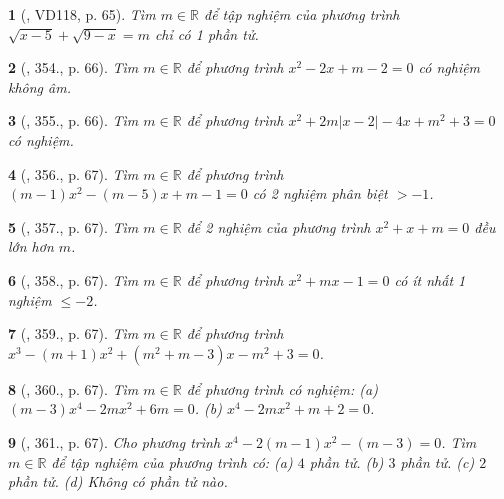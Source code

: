 \documentclass{article}
\newtheorem{baitoan}{}
\begin{document}
\begin{baitoan}[\cite{Binh_Toan_9_tap_2}, VD118, p. 65]
	Tìm $m\in\mathbb{R}$ để tập nghiệm của phương trình $\sqrt{x - 5} + \sqrt{9 - x} = m$ chỉ có 1 phần tử.
\end{baitoan}

\begin{baitoan}[\cite{Binh_Toan_9_tap_2}, 354., p. 66]
	Tìm $m\in\mathbb{R}$ để phương trình $x^2 - 2x + m - 2 = 0$ có nghiệm không âm.
\end{baitoan}

\begin{baitoan}[\cite{Binh_Toan_9_tap_2}, 355., p. 66]
	Tìm $m\in\mathbb{R}$ để phương trình $x^2 + 2m|x - 2| - 4x + m^2 + 3 = 0$ có nghiệm.
\end{baitoan}

\begin{baitoan}[\cite{Binh_Toan_9_tap_2}, 356., p. 67]
	Tìm $m\in\mathbb{R}$ để phương trình $(m - 1)x^2 - (m - 5)x + m - 1 = 0$ có 2 nghiệm phân biệt $> -1$.
\end{baitoan}

\begin{baitoan}[\cite{Binh_Toan_9_tap_2}, 357., p. 67]
	Tìm $m\in\mathbb{R}$ để 2 nghiệm của phương trình $x^2 + x + m = 0$ đều lớn hơn $m$.
\end{baitoan}

\begin{baitoan}[\cite{Binh_Toan_9_tap_2}, 358., p. 67]
	Tìm $m\in\mathbb{R}$ để phương trình $x^2 + mx - 1 = 0$ có ít nhất 1 nghiệm $\le-2$.
\end{baitoan}

\begin{baitoan}[\cite{Binh_Toan_9_tap_2}, 359., p. 67]
	Tìm $m\in\mathbb{R}$ để phương trình $x^3 - (m + 1)x^2 + (m^2 + m - 3)x - m^2 + 3 = 0$.
\end{baitoan}

\begin{baitoan}[\cite{Binh_Toan_9_tap_2}, 360., p. 67]
	Tìm $m\in\mathbb{R}$ để phương trình có nghiệm: (a) $(m - 3)x^4 - 2mx^2 + 6m = 0$. (b) $x^4 - 2mx^2 + m + 2 = 0$.
\end{baitoan}

\begin{baitoan}[\cite{Binh_Toan_9_tap_2}, 361., p. 67]
	Cho phương trình $x^4 - 2(m - 1)x^2 - (m - 3) = 0$. Tìm $m\in\mathbb{R}$ để tập nghiệm của phương trình có: (a) $4$ phần tử. (b) $3$ phần tử. (c) $2$ phần tử. (d) Không có phần tử nào.
\end{baitoan}
\end{document}
